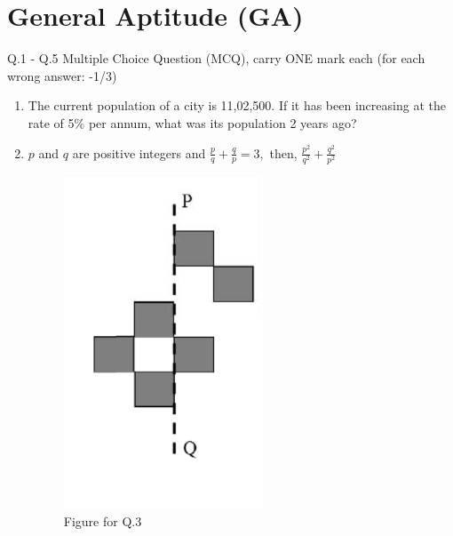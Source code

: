\documentclass[journal]{IEEEtran}
\begin{document}
\section{General Aptitude (GA)}
Q.1 - Q.5 Multiple Choice Question (MCQ), carry ONE mark each (for each wrong answer: -1/3)
\bigskip
\begin{enumerate}[start=1]
	\item The current population of a city is 11,02,500. If it has been increasing at the rate of 5\% per annum, what was its population 2 years ago?
    \hfill{}
\begin{enumerate}
\end{enumerate}

\item  $p$ and $q$ are positive integers and  $\frac{p}{q} + \frac{q}{p} = 3,$ then, $\frac{p^2}{q^2} + \frac{q^2}{p^2}$
\hfill{}
\begin{enumerate}
\end{enumerate}

\begin{figure}[H]
    \centering
    \includegraphics[width=0.3\columnwidth]{figs/image_1.png}
    \caption{Figure for Q.3}
    \label{Figure1}
\end{figure}


\end{enumerate}
\end{document}
